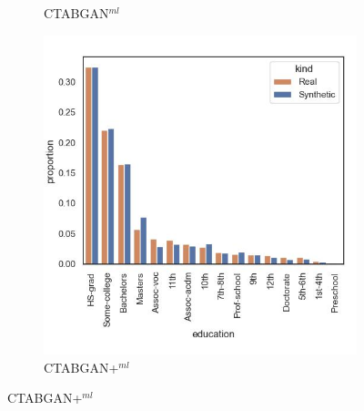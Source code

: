 \begin{figure}[H]
\begin{subfigure}{0.3\textwidth}
		\caption{CTABGAN$^{ml}$}
	\end{subfigure}
	\begin{subfigure}{0.3\textwidth}
		\centering
		\includegraphics[width=\textwidth]{images/dist_education/ctabgan+.jpg}
		\caption{CTABGAN+$^{ml}$}
	\end{subfigure}



\end{figure}
